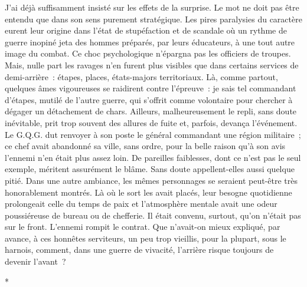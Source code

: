 \documentclass[french,twoside]{book} %
\begin{document}
J’ai déjà suffisamment insisté sur les effets de la surprise. Le mot ne doit pas être entendu que dans son sens purement stratégique. Les pires paralysies du caractère eurent leur origine dans l’état de stupéfaction et de scandale où un rythme de guerre inopiné jeta des hommes préparés, par leurs éducateurs, à une tout autre image du combat. Ce choc psychologique n’épargna pas les officiers de troupes. Mais,   nulle part les ravages n’en furent plus visibles que dans certains services de demi-arrière : étapes, places, états-majors territoriaux. Là, comme partout, quelques âmes vigoureuses se raidirent contre l’épreuve : je sais tel commandant d’étapes, mutilé de l’autre guerre, qui s’offrit comme volontaire pour chercher à dégager un détachement de chars. Ailleurs, malheureusement le repli, sans doute inévitable, prit trop souvent des allures de fuite et, parfois, devança l’événement. Le G.Q.G. dut renvoyer à son poste le général commandant une région militaire ; ce chef avait abandonné sa ville, sans ordre, pour la belle raison qu’à son avis l’ennemi n’en était plus assez loin. De pareilles faiblesses, dont ce n’est pas le seul exemple, méritent assurément le blâme. Sans doute appellent-elles aussi quelque pitié. Dans une autre ambiance, les mêmes personnages se seraient peut-être très honorablement montrés. Là où le sort les avait placés, leur besogne quotidienne prolongeait celle du temps de paix et l’atmosphère mentale avait une odeur poussiéreuse de bureau ou de chefferie. Il était convenu, surtout, qu’on n’était pas sur le front. L’ennemi rompit le contrat. Que n’avait-on mieux expliqué, par avance, à ces honnêtes serviteurs, un peu trop vieillis, pour la plupart, sous le harnois, comment, dans une guerre de vivacité, l’arrière risque toujours de devenir l’avant ?\par

\begin{center}
\noindent \centerline{*}\par
\end{center}
\end{document}
